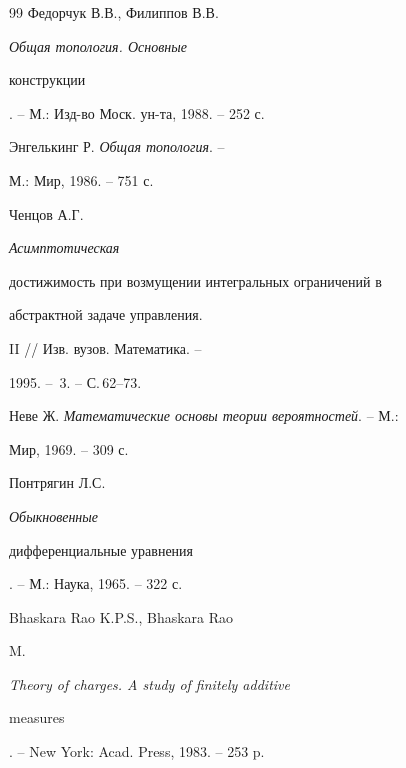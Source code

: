 \begin{thebibliography}{99}
 Федорчук В.В., Филиппов В.В. {\em Общая топология. Основные


конструкции}. -- М.: Изд-во Моск. ун-та, 1988. -- 252 с.





 Энгелькинг Р. {\em Общая топология}. --


М.: Мир, 1986. -- 751 с.





 Ченцов А.Г. {\em Асимптотическая


достижимость при возмущении интегральных ограничений в


абстрактной задаче управления.} II // Изв. вузов. Математика. --


1995. -- \No\,3. -- С.\,62--73.





 Неве Ж. {\em Математические основы теории вероятностей}. -- М.:


Мир, 1969. -- 309 с.





 Понтрягин Л.С. {\em Обыкновенные


дифференциальные уравнения}. -- М.: Наука, 1965. -- 322 с.





 Bhaskara Rao K.P.S., Bhaskara Rao


M. {\em Theory of charges. A study of finitely additive


measures}. -- New York: Acad. Press, 1983. -- 253 p.





\end{thebibliography}





\vskip 2cm














\label{end}





